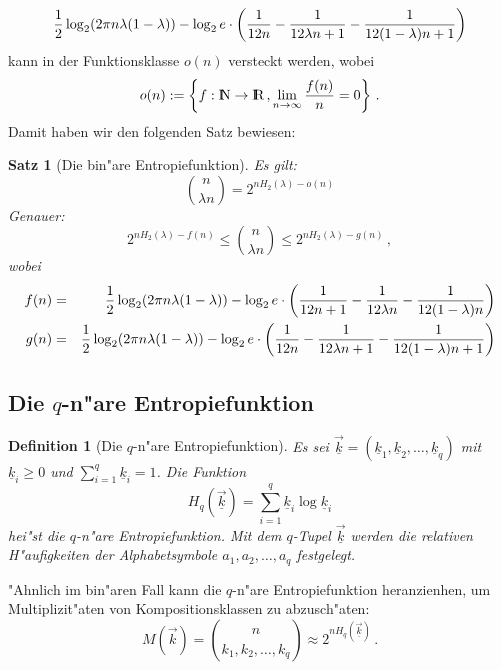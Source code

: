 \documentclass[10pt]{article}
\newtheorem{definition}{Definition}[section]
\newtheorem{satz}[theorem]{Satz}
\begin{document}
$$  {1\over 2} \log_2 (2\pi n \lambda (1-\lambda)) -
    \log_2 e \cdot \left({1\over 12n} - {1\over 12\lambda n+1} - 
    {1\over 12(1-\lambda)n+1}\right) $$
kann in der Funktionsklasse $o(n)$ versteckt werden, wobei
$$ o(n) := \left\{ f : \N \rightarrow \R \, , \lim_{n\rightarrow\infty}
                   {f(n)\over n} = 0 \right\} \, . $$
Damit haben wir den folgenden Satz bewiesen:
\begin{satz}[Die bin"are Entropiefunktion]\label{binaereEntropie}
Es gilt:
$$
  {n\choose \lambda n} = 2^{n H_2(\lambda)-o(n)}
$$
Genauer:
$$
  2^{n H_2(\lambda)-f(n)} \le {n\choose \lambda n} 
  \le 2^{n H_2(\lambda)-g(n)} \, ,
$$
wobei 
\begin{eqnarray*}
  f(n) & = & 
  {1\over 2} \log_2 (2\pi n \lambda (1-\lambda)) -
    \log_2 e \cdot \left({1\over 12n+1} - {1\over 12\lambda n} - 
    {1\over 12(1-\lambda)n}\right) \\
  g(n)  & = & 
  {1\over 2} \log_2 (2\pi n \lambda (1-\lambda)) -
    \log_2 e \cdot \left({1\over 12n} - {1\over 12\lambda n+1} - 
    {1\over 12(1-\lambda)n+1}\right)
\end{eqnarray*}
\end{satz}


\subsection{Die $q$-n"are Entropiefunktion}
\begin{definition}[Die $q$-n"are Entropiefunktion]
Es sei
$\vec{\underline{k}}=(\underline{k}_1,\underline{k}_2,\ldots,\underline{k}_q)$
mit $\underline{k}_i\ge 0$ und $\sum_{i=1}^q \underline{k}_i=1$.
Die Funktion
$$
  H_q(\vec{\underline{k}}) = 
  \sum_{i=1}^q \underline{k}_i\log \underline{k}_i
$$
hei"st die \emph{$q$-n"are Entropiefunktion}. Mit dem $q$-Tupel
$\vec{\underline{k}}$ werden die relativen H"aufigkeiten der Alphabetsymbole
$a_1,a_2,\ldots,a_q$ festgelegt.
\end{definition}
"Ahnlich im bin"aren Fall kann die $q$-n"are Entropiefunktion heranzienhen, um
Multiplizit"aten von Kompositionsklassen zu abzusch"aten:
$$ M(\vec{k})={n \choose k_1, k_2, \ldots, k_q} \approx 
2^{n H_q(\vec{\underline{k}})}\,. $$
\end{document}
